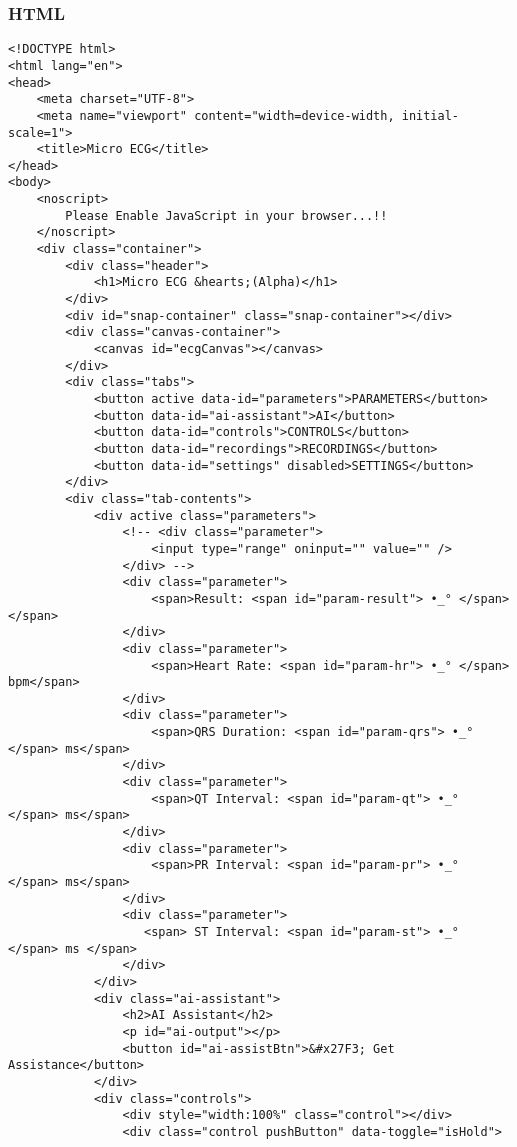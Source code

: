 \subsubsection*{HTML}
\begin{lstlisting}[style=htmlcssjs]
<!DOCTYPE html>
<html lang="en">
<head>
    <meta charset="UTF-8">
    <meta name="viewport" content="width=device-width, initial-scale=1">
    <title>Micro ECG</title>
</head>
<body>
    <noscript>
        Please Enable JavaScript in your browser...!!
    </noscript>
    <div class="container">
        <div class="header">
            <h1>Micro ECG &hearts;(Alpha)</h1>
        </div>
        <div id="snap-container" class="snap-container"></div>
        <div class="canvas-container">
            <canvas id="ecgCanvas"></canvas>
        </div>
        <div class="tabs">
            <button active data-id="parameters">PARAMETERS</button>
            <button data-id="ai-assistant">AI</button>
            <button data-id="controls">CONTROLS</button>
            <button data-id="recordings">RECORDINGS</button>
            <button data-id="settings" disabled>SETTINGS</button>
        </div>
        <div class="tab-contents">
            <div active class="parameters">
                <!-- <div class="parameter">
                    <input type="range" oninput="" value="" />
                </div> -->
                <div class="parameter">
                    <span>Result: <span id="param-result"> •_° </span> </span>
                </div>
                <div class="parameter">
                    <span>Heart Rate: <span id="param-hr"> •_° </span> bpm</span>
                </div>
                <div class="parameter">
                    <span>QRS Duration: <span id="param-qrs"> •_° </span> ms</span>
                </div>
                <div class="parameter">
                    <span>QT Interval: <span id="param-qt"> •_° </span> ms</span>
                </div>
                <div class="parameter">
                    <span>PR Interval: <span id="param-pr"> •_° </span> ms</span>
                </div>
                <div class="parameter">
                   <span> ST Interval: <span id="param-st"> •_° </span> ms </span>
                </div>
            </div>
            <div class="ai-assistant">
                <h2>AI Assistant</h2>
                <p id="ai-output"></p>
                <button id="ai-assistBtn">&#x27F3; Get Assistance</button>
            </div>
            <div class="controls">
                <div style="width:100%" class="control"></div>
                <div class="control pushButton" data-toggle="isHold">

\end{lstlisting}

